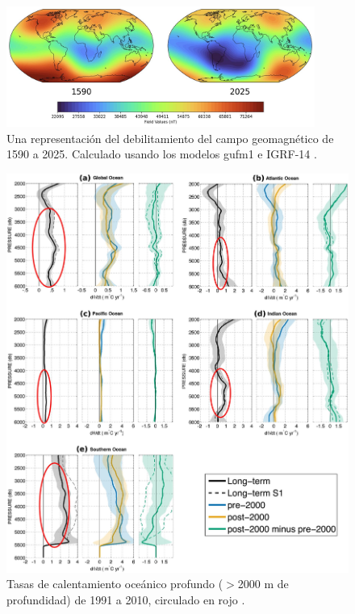 \documentclass[10pt,twocolumn,letterpaper]{article}
\begin{document}
\begin{figure}[t]
\begin{center}
\includegraphics[width=0.9\textwidth]{saa.jpg}
\end{center}
   \caption{Una representación del debilitamiento del campo geomagnético de 1590 a 2025. Calculado usando los modelos gufm1 e IGRF-14 \cite{125,126}.}
\label{fig:14}
\end{figure}

\begin{figure}[t]
\begin{center}
   \includegraphics[width=1\linewidth]{ocean-highlight.jpg}
\end{center}
   \caption{Tasas de calentamiento oceánico profundo ($>$2000 m de profundidad) de 1991 a 2010, circulado en rojo \cite{132}.}
\label{fig:15}
\label{fig:onecol}
\end{figure}
\end{document}
